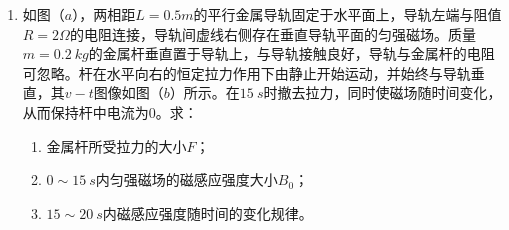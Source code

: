 \begin{enumerate}
\begin{enumerate}
\end{enumerate}
\begin{figure}[h!]
\flushright

\end{figure}




\newpage
\item 
{}
如图（$ a $），两相距$ L=0.5m $的平行金属导轨固定于水平面上，导轨左端与阻值$ R=2 \Omega $的电阻连接，导轨间虚线右侧存在垂直导轨平面的匀强磁场。质量$ m=0.2 \ kg $的金属杆垂直置于导轨上，与导轨接触良好，导轨与金属杆的电阻可忽略。杆在水平向右的恒定拉力作用下由静止开始运动，并始终与导轨垂直，其$ v - t $图像如图（$ b $）所示。在$ 15 \ s $时撤去拉力，同时使磁场随时间变化，从而保持杆中电流为$ 0 $。求：
\begin{enumerate}
\renewcommand{\labelenumi}{\arabic{enumi}.}
\item
金属杆所受拉力的大小$ F $；
\item 
$ 0 \sim15 \ s $内匀强磁场的磁感应强度大小$ B_{0} $；
\item 
$ 15 \sim 20 \ s $内磁感应强度随时间的变化规律。

\end{enumerate}
\begin{figure}[h!]
\flushright

\end{figure}

\end{enumerate}
